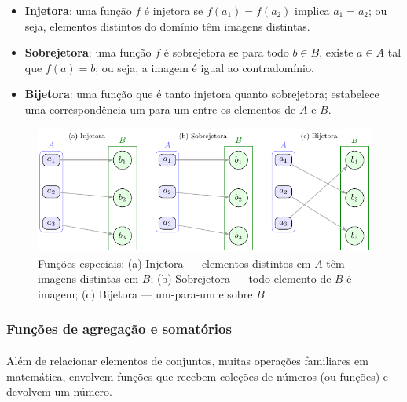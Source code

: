 \documentclass[12pt,a4paper]{article}
\def\emph#1{#1}%
\begin{document}
\begin{itemize}
    \item \textbf{Injetora}: uma função \(f\) é injetora se \(f(a_1) = f(a_2)\) implica \(a_1 = a_2\); ou seja, elementos distintos do domínio têm imagens distintas.
    \item \textbf{Sobrejetora}: uma função \(f\) é sobrejetora se para todo \(b \in B\), existe \(a \in A\) tal que \(f(a) = b\); ou seja, a imagem é igual ao contradomínio.
    \item \textbf{Bijetora}: uma função que é tanto injetora quanto sobrejetora; estabelece uma correspondência um-para-um entre os elementos de \(A\) e \(B\).
    
\end{itemize}


\begin{figure}[H]
    \centering
    \includegraphics[width=0.9\linewidth]{figures/fig_inj_sobre_bij.pdf}

    \caption{Funções especiais: (a) Injetora — elementos distintos em $A$ têm imagens distintas em $B$; (b) Sobrejetora — todo elemento de $B$ é imagem; (c) Bijetora — um-para-um e sobre $B$.}
    \label{fig:inj-sobre-bij}\end{figure}


\subsubsection{Funções de agregação e somatórios}

\paragraph{}
Além de relacionar elementos de conjuntos, muitas operações familiares em matemática, envolvem \emph{funções} que recebem coleções de números (ou funções) e devolvem um número.
\end{document}

